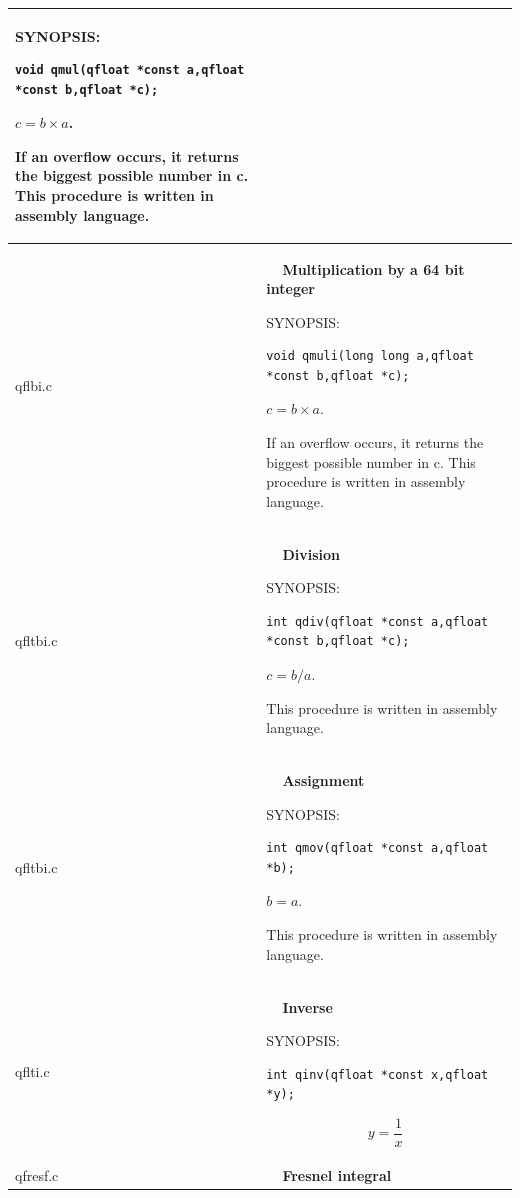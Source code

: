 \documentclass[10pt,a4paper,x11names]{memoir} %
\newcounter{entry}
\newcommand{\TOC}[1] {\addcontentsline{toc}{section}{\theentry\ \  #1} \textbf{\theentry\ \  #1} \par\stepcounter{entry}}
\begin{document}
\begin{longtable}{|p{1.5cm}|p{11.5cm}|}
	{\footnotesize SYNOPSIS:}\vspace{-0.2cm}\index{qmul}
	\begin{lstlisting}[numbers=none]
		void qmul(qfloat *const a,qfloat *const b,qfloat *c); 
	\end{lstlisting}\vspace{-0.2cm}
	$c=b\times a$.\par
	If an overflow occurs, it returns the biggest possible number in c. This procedure is written in assembly language.
	
	\\\hline
	qflbi.c& \TOC{Multiplication by a 64 bit integer}
	
	{\footnotesize SYNOPSIS:}\vspace{-0.2cm}\index{qmuli}
	\begin{lstlisting}[numbers=none]
		void qmuli(long long a,qfloat *const b,qfloat *c); 
	\end{lstlisting}\vspace{-0.2cm}
	$c=b\times a$.\par
	If an overflow occurs, it returns the biggest possible number in c. This procedure is written in assembly language.
	\\\hline
	qfltbi.c& \TOC{Division}
	
	{\footnotesize SYNOPSIS:}\vspace{-0.2cm}\index{qdiv}
	\begin{lstlisting}[numbers=none]
		int qdiv(qfloat *const a,qfloat *const b,qfloat *c);
	\end{lstlisting}\vspace{-0.2cm}
	$c=b/a$.\par
	This procedure is written in assembly language.
	\\\hline
	qfltbi.c&  \TOC{Assignment}
	
	{\footnotesize SYNOPSIS:}\vspace{-0.2cm}\index{qmov}
	\begin{lstlisting}[numbers=none]
		int qmov(qfloat *const a,qfloat *b);
	\end{lstlisting}\vspace{-0.2cm}
	$b=a$.\par
	This procedure is written in assembly language.
	\\\hline
	qflti.c&\TOC{Inverse}
	{\footnotesize SYNOPSIS:}\vspace{-0.2cm}\index{qmov}
	\begin{lstlisting}[numbers=none]
		int qinv(qfloat *const x,qfloat *y);
	\end{lstlisting}\vspace{-0.2cm}
	$$y=\frac{1}{x}$$
	\\\hline
	qfresf.c& \TOC{Fresnel integral}
	

\end{longtable}
\end{document}
